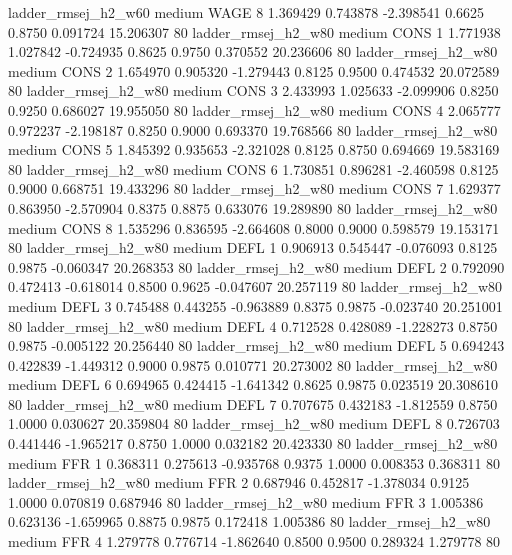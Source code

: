    ladder_rmsej_h2_w60     medium     WAGE                 8  1.369429 0.743878 -2.398541 0.6625 0.8750  0.091724   15.206307 80
   ladder_rmsej_h2_w80     medium     CONS                 1  1.771938 1.027842 -0.724935 0.8625 0.9750  0.370552   20.236606 80
   ladder_rmsej_h2_w80     medium     CONS                 2  1.654970 0.905320 -1.279443 0.8125 0.9500  0.474532   20.072589 80
   ladder_rmsej_h2_w80     medium     CONS                 3  2.433993 1.025633 -2.099906 0.8250 0.9250  0.686027   19.955050 80
   ladder_rmsej_h2_w80     medium     CONS                 4  2.065777 0.972237 -2.198187 0.8250 0.9000  0.693370   19.768566 80
   ladder_rmsej_h2_w80     medium     CONS                 5  1.845392 0.935653 -2.321028 0.8125 0.8750  0.694669   19.583169 80
   ladder_rmsej_h2_w80     medium     CONS                 6  1.730851 0.896281 -2.460598 0.8125 0.9000  0.668751   19.433296 80
   ladder_rmsej_h2_w80     medium     CONS                 7  1.629377 0.863950 -2.570904 0.8375 0.8875  0.633076   19.289890 80
   ladder_rmsej_h2_w80     medium     CONS                 8  1.535296 0.836595 -2.664608 0.8000 0.9000  0.598579   19.153171 80
   ladder_rmsej_h2_w80     medium     DEFL                 1  0.906913 0.545447 -0.076093 0.8125 0.9875 -0.060347   20.268353 80
   ladder_rmsej_h2_w80     medium     DEFL                 2  0.792090 0.472413 -0.618014 0.8500 0.9625 -0.047607   20.257119 80
   ladder_rmsej_h2_w80     medium     DEFL                 3  0.745488 0.443255 -0.963889 0.8375 0.9875 -0.023740   20.251001 80
   ladder_rmsej_h2_w80     medium     DEFL                 4  0.712528 0.428089 -1.228273 0.8750 0.9875 -0.005122   20.256440 80
   ladder_rmsej_h2_w80     medium     DEFL                 5  0.694243 0.422839 -1.449312 0.9000 0.9875  0.010771   20.273002 80
   ladder_rmsej_h2_w80     medium     DEFL                 6  0.694965 0.424415 -1.641342 0.8625 0.9875  0.023519   20.308610 80
   ladder_rmsej_h2_w80     medium     DEFL                 7  0.707675 0.432183 -1.812559 0.8750 1.0000  0.030627   20.359804 80
   ladder_rmsej_h2_w80     medium     DEFL                 8  0.726703 0.441446 -1.965217 0.8750 1.0000  0.032182   20.423330 80
   ladder_rmsej_h2_w80     medium      FFR                 1  0.368311 0.275613 -0.935768 0.9375 1.0000  0.008353    0.368311 80
   ladder_rmsej_h2_w80     medium      FFR                 2  0.687946 0.452817 -1.378034 0.9125 1.0000  0.070819    0.687946 80
   ladder_rmsej_h2_w80     medium      FFR                 3  1.005386 0.623136 -1.659965 0.8875 0.9875  0.172418    1.005386 80
   ladder_rmsej_h2_w80     medium      FFR                 4  1.279778 0.776714 -1.862640 0.8500 0.9500  0.289324    1.279778 80
